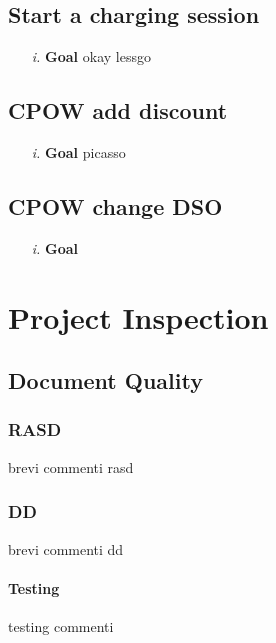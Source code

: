 \documentclass[table, 12pt]{article}
\begin{document}
\subsection{Start a charging session}
\begin{itemize}
    \item[\textit{i.}] \textbf{Goal} okay lessgo
\end{itemize}

\subsection{CPOW add discount}
\begin{itemize}
    \item[\textit{i.}] \textbf{Goal} picasso
\end{itemize} 


\subsection{CPOW change DSO}
\begin{itemize}
    \item[\textit{i.}] \textbf{Goal}   
\end{itemize}



\section{Project Inspection}

\subsection{Document Quality}
\subsubsection{RASD}
brevi commenti rasd

\subsubsection{DD}
brevi commenti dd

\paragraph{Testing}
testing commenti
\end{document}
